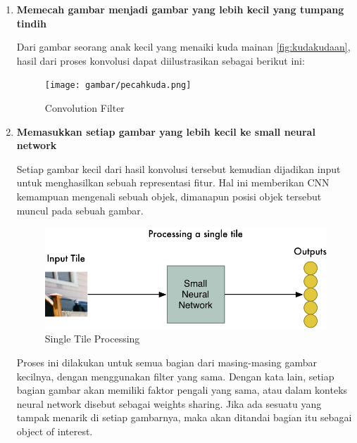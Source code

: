 \begin{enumerate}
	\item \textbf{Memecah gambar menjadi gambar yang lebih kecil yang tumpang tindih}
	
	Dari gambar seorang anak kecil yang menaiki kuda mainan \ref{fig:kudakudaan}, hasil dari proses konvolusi dapat diilustrasikan sebagai berikut ini:
	
	\begin{figure}[ht]
		\centering
		
		\texttt{[image: gambar/pecahkuda.png]}
		
		\caption{Convolution Filter \citep{cit:kuda}}
		\label{fig:kudapecah}
	\end{figure}

	\item \textbf{Memasukkan setiap gambar yang lebih kecil ke small neural network}
	
	Setiap gambar kecil dari hasil konvolusi tersebut kemudian dijadikan input untuk menghasilkan sebuah representasi fitur. Hal ini memberikan CNN kemampuan mengenali sebuah objek, dimanapun posisi objek tersebut muncul pada sebuah gambar.
	
	\begin{figure}[ht]
		\centering
		
		\includegraphics[width=0.7\columnwidth]{gambar/singletile.png}
		
		\caption{Single Tile Processing \citep{cit:kuda}}
		\label{fig:singletile}
	\end{figure}
	
	Proses ini dilakukan untuk semua bagian dari masing-masing gambar kecilnya, dengan menggunakan filter yang sama. Dengan kata lain, setiap bagian gambar akan memiliki faktor pengali yang sama, atau dalam konteks neural network disebut sebagai weights sharing. Jika ada sesuatu yang tampak menarik di setiap gambarnya, maka akan ditandai bagian itu sebagai object of interest.
	

\end{enumerate}

